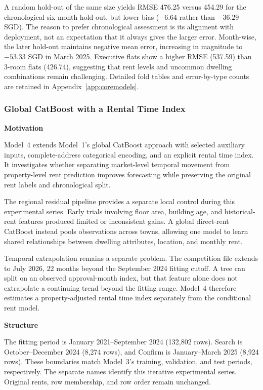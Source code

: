 \documentclass[10pt,a4paper]{article}
\begin{document}
A random hold-out of the same size yields RMSE 476.25 versus 454.29 for the chronological six-month hold-out, but lower bias ($-6.64$ rather than $-36.29$ SGD). The reason to prefer chronological assessment is its alignment with deployment, not an expectation that it always gives the larger error. Month-wise, the later hold-out maintains negative mean error, increasing in magnitude to $-53.33$ SGD in March 2025. Executive flats show a higher RMSE (537.59) than 3-room flats (426.74), suggesting that rent levels and uncommon dwelling combinations remain challenging. Detailed fold tables and error-by-type counts are retained in Appendix~\ref{app:coremodels}.

\subsubsection{Global CatBoost with a Rental Time Index}
\label{sec:time-index}

\textbf{Motivation}

Model~4 extends Model~1's global CatBoost approach with selected
auxiliary inputs, complete-address categorical encoding, and an
explicit rental time index.
It investigates whether separating market-level temporal movement
from property-level rent prediction improves forecasting while
preserving the original rent labels and chronological split.

The regional residual pipeline provides a separate local control
during this experimental series.
Early trials involving floor area, building age, and historical-rent
features produced limited or inconsistent gains.
A global direct-rent CatBoost instead pools observations across towns,
allowing one model to learn shared relationships between dwelling
attributes, location, and monthly rent.

Temporal extrapolation remains a separate problem.
The competition file extends to July 2026, 22 months beyond the
September 2024 fitting cutoff.
A tree can split on an observed approval-month index, but that
feature alone does not extrapolate a continuing trend beyond the
fitting range.
Model~4 therefore estimates a property-adjusted rental time index
separately from the conditional rent model.

\textbf{Structure}

The fitting period is January 2021--September 2024
(132{,}802 rows).
Search is October--December 2024 (8{,}274 rows), and Confirm is
January--March 2025 (8{,}924 rows).
These boundaries match Model~3's training, validation, and test
periods, respectively.
The separate names identify this iterative experimental series.
Original rents, row membership, and row order remain unchanged.
\end{document}
